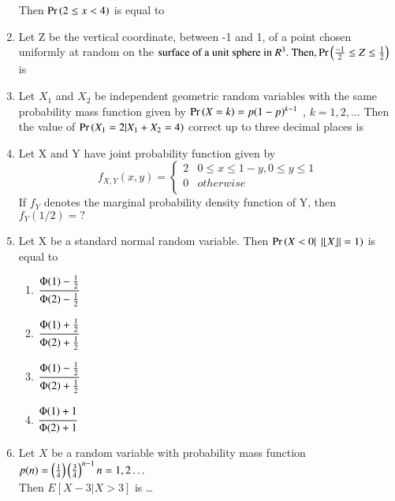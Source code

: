 \documentclass[journal,12pt,twocolumn]{IEEEtran}
\begin{document}
\begin{enumerate}
Then $\Pr\left(2\le x <4\right)$ is equal to 
%
\\
  \solution
  
\item Let Z be the vertical coordinate, between -1 and 1, of a point chosen uniformly at random on the
\begin{math}
\text{surface of a unit sphere in }R^3.\text{ Then,} \Pr\left(\frac{-1}{2} \leq Z \leq \frac{1}{2}\right)
\end{math}
is
\\
  \solution
  
%
\item Let $X_1$ and $X_2$ be independent geometric random variables with the same probability
mass function given by $\Pr\left(X = k\right) = p(1-p)^{k-1}$
, $k = 1, 2, \ldots$ Then the value of
$\Pr\left(X_1 = 2 | X_1 + X_2 = 4\right)$ correct up to three decimal places is
\\
  \solution
  
%
\item     Let X and Y have joint probability function given by\\
    $$f_{X,Y}(x,y)=\left\{
    \begin{array}{ll}
      2 & 0\leq x\leq 1-y,0\leq y\leq 1 \\
      0 & otherwise \\
    \end{array} 
    \right. $$
    If $f_{Y}$ denotes the marginal probability density function of Y, then $f_{Y}(1/2)=?$
\\
\solution

%
\item Let X be a standard normal random variable. Then $\Pr\left(X < 0 |\;\left\vert\lfloor X\rfloor\right\vert = 1\right)$ is equal to
\begin{enumerate}[label = \alph*)]
    \item $\cfrac{\Phi(1) - \frac{1}{2}}{\Phi(2) - \frac{1}{2}}$
    \item $\cfrac{\Phi(1) + \frac{1}{2}}{\Phi(2) + \frac{1}{2}}$
    \item $\cfrac{\Phi(1) - \frac{1}{2}}{\Phi(2) + \frac{1}{2}}$
    \item $\cfrac{\Phi(1) + 1}{\Phi(2) + 1}$
\end{enumerate}
%
\solution

%
\item Let $X$ be a random variable with probability mass function 
$p(n) = \left(\frac{1}{4}\right)\left(\frac{3}{4}\right)^{n-1}  n=1,2 \ldots $ \\
Then $E[X-3|X>3]$ is \dots
\\

\end{enumerate}
\end{document}
